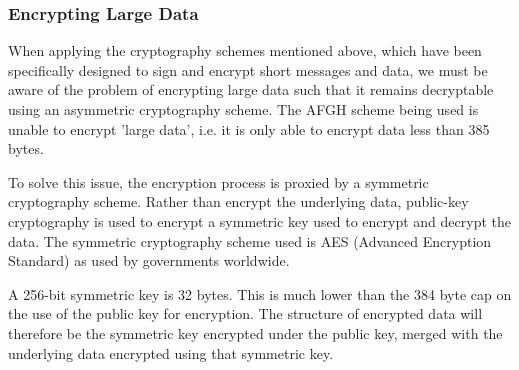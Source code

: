 \subsubsection{Encrypting Large Data}

When applying the cryptography schemes mentioned above, which have been specifically designed to sign and encrypt short messages and data, we must be aware of the problem of encrypting large data such that it remains decryptable using an asymmetric cryptography scheme. The AFGH scheme being used is unable to encrypt 'large data', i.e. it is only able to encrypt data less than 385 bytes.

To solve this issue, the encryption process is proxied by a symmetric cryptography scheme. Rather than encrypt the underlying data, public-key cryptography is used to encrypt a symmetric key used to encrypt and decrypt the data. The symmetric cryptography scheme used is AES (Advanced Encryption Standard) as used by governments worldwide.

A 256-bit symmetric key is 32 bytes. This is much lower than the 384 byte cap on the use of the public key for encryption. The structure of encrypted data will therefore be the symmetric key encrypted under the public key, merged with the underlying data encrypted using that symmetric key.
